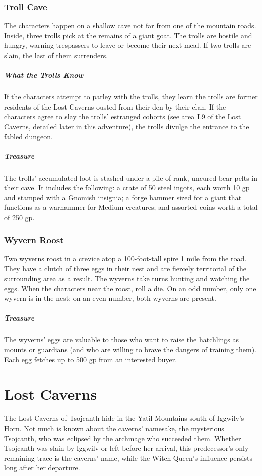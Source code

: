 \documentclass[10pt,a4paper,twoside,bg=print,twocolumn,openany,nodeprecatedcode]{dndbook}
\begin{document}
\subsubsection{Troll Cave}
The characters happen on a shallow cave not far from one of the mountain roads. Inside, three trolls pick at the remains of a giant goat. The trolls are hostile and hungry, warning trespassers to leave or become their next meal. If two trolls are slain, the last of them surrenders.

\subparagraph{What the Trolls Know}
If the characters attempt to parley with the trolls, they learn the trolls are former residents of the Lost Caverns ousted from their den by their clan. If the characters agree to slay the trolls' estranged cohorts (see area L9 of the Lost Caverns, detailed later in this adventure), the trolls divulge the entrance to the fabled dungeon.

\subparagraph{Treasure}
The trolls' accumulated loot is stashed under a pile of rank, uncured bear pelts in their cave. It includes the following: a crate of 50 steel ingots, each worth 10 gp and stamped with a Gnomish insignia; a forge hammer sized for a giant that functions as a warhammer for Medium creatures; and assorted coins worth a total of 250 gp.

\subsubsection{Wyvern Roost}
Two wyverns roost in a crevice atop a 100-foot-tall spire 1 mile from the road. They have a clutch of three eggs in their nest and are fiercely territorial of the surrounding area as a result. The wyverns take turns hunting and watching the eggs. When the characters near the roost, roll a die. On an odd number, only one wyvern is in the nest; on an even number, both wyverns are present.

\subparagraph{Treasure}
The wyverns' eggs are valuable to those who want to raise the hatchlings as mounts or guardians (and who are willing to brave the dangers of training them). Each egg fetches up to 500 gp from an interested buyer.

\section{Lost Caverns}
The Lost Caverns of Tsojcanth hide in the Yatil Mountains south of Iggwilv's Horn. Not much is known about the caverns' namesake, the mysterious Tsojcanth, who was eclipsed by the archmage who succeeded them. Whether Tsojcanth was slain by Iggwilv or left before her arrival, this predecessor's only remaining trace is the caverns' name, while the Witch Queen's influence persists long after her departure.
\end{document}
